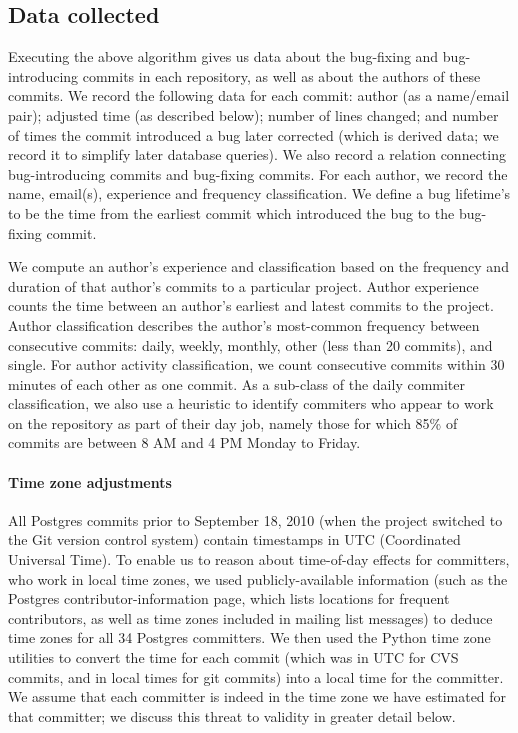 \subsection{Data collected}
\label{sec:data}
Executing the above algorithm gives us data about the bug-fixing
and bug-introducing commits
in each repository, as well as about the authors of these commits.  We
record the following data for each commit: author (as a name/email
pair); adjusted time (as described below); number of lines changed; 
and number of times the
commit introduced a bug later corrected (which is derived data; we
record it to simplify later database queries). We also record a
relation connecting bug-introducing commits and bug-fixing
commits. For each author, we record the name, email(s), experience and
frequency classification. We define a bug lifetime's to be the time from the
earliest commit which introduced the bug to the bug-fixing commit.

We compute an author's experience and classification based on the
frequency and duration of that author's commits to a particular
project. Author experience counts the time between an author's
earliest and latest commits to the project. Author classification
describes the author's most-common frequency between consecutive
commits: daily, weekly, monthly, other (less than 20 commits), and
single. For author activity classification, we count consecutive
commits within 30 minutes of each other as one commit. As a sub-class
of the daily commiter classification, we also use a heuristic to
identify commiters who appear to work on the repository as part of
their day job, namely those for which 85\% of commits are between 8 AM
and 4 PM Monday to Friday.

\paragraph{Time zone adjustments}
All Postgres commits prior to September 18, 2010 (when the project
switched to the Git version control system) contain timestamps in UTC
(Coordinated Universal Time). To enable us to reason about time-of-day
effects for committers, who work in local time zones, we used
publicly-available information (such as the Postgres
contributor-information page, which lists locations for frequent
contributors, as well as time zones included in mailing list messages) to deduce
time zones for all 34 Postgres committers. We then used the Python
time zone utilities to convert the time for each commit (which was in
UTC for CVS commits, and in local times for git commits) into a local
time for the committer. We assume that each committer is indeed in
the time zone we have estimated for that committer; 
we discuss this threat to validity in greater detail below.

